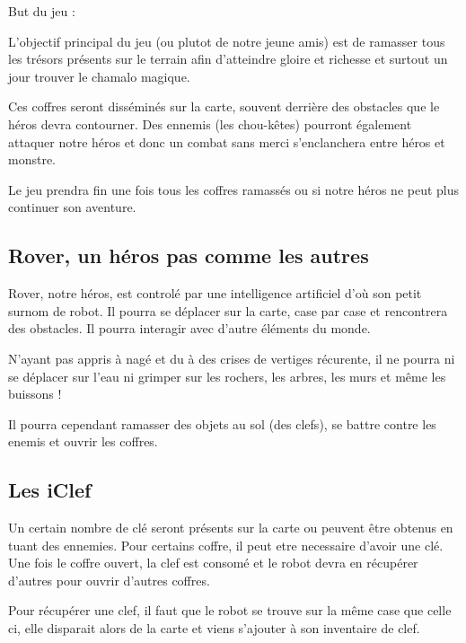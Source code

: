 \documentclass[a4paper 12pts]{article}
\begin{document}

But du jeu :

L'objectif  principal du jeu (ou plutot de notre jeune amis) est de ramasser tous les trésors présents 
sur le terrain afin d'atteindre gloire et richesse et surtout un jour trouver le chamalo magique.

Ces coffres seront disséminés sur la carte, souvent derrière des obstacles que le héros devra contourner. 
Des ennemis (les chou-kêtes) pourront également attaquer notre héros et donc un combat sans merci s'enclanchera entre héros et monstre.

Le jeu prendra fin une fois tous les coffres ramassés ou si notre héros ne peut plus continuer son aventure.


\subsection{Rover, un héros pas comme les autres}



Rover, notre héros, est controlé par une intelligence artificiel d'où son petit surnom de robot.
Il pourra se déplacer sur la carte, case par case et rencontrera des obstacles. 
Il pourra interagir avec d'autre éléments du monde. 

N'ayant pas appris à nagé et du à des crises de vertiges récurente, il ne pourra ni se déplacer sur l'eau ni grimper sur les rochers,
les arbres, les murs et même les buissons !

Il pourra cependant ramasser des objets au sol (des clefs), se battre contre les enemis et ouvrir les coffres. 

\subsection{Les iClef}


Un certain nombre de clé seront présents sur la carte ou peuvent être obtenus en tuant des ennemies.
Pour certains coffre, il peut etre necessaire d'avoir une clé. 
Une fois le coffre ouvert, la clef est consomé et le robot devra en récupérer d'autres pour ouvrir d'autres coffres.

Pour récupérer une clef, il faut que le robot se trouve sur la même case que celle ci, elle disparait alors de la carte et 
viens s'ajouter à son inventaire de clef.
\end{document}
